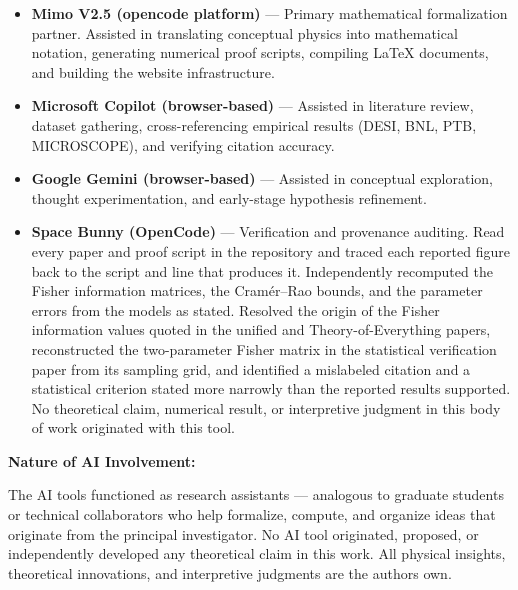\documentclass[
  10pt,
]{article}
\providecommand{\tightlist}{%
  \setlength{\itemsep}{0pt}\setlength{\parskip}{0pt}}
\begin{document}
\begin{itemize}
\tightlist
\item
  \textbf{Mimo V2.5 (opencode platform)} --- Primary mathematical
  formalization partner. Assisted in translating conceptual physics into
  mathematical notation, generating numerical proof scripts, compiling
  LaTeX documents, and building the website infrastructure.
\item
  \textbf{Microsoft Copilot (browser-based)} --- Assisted in literature
  review, dataset gathering, cross-referencing empirical results (DESI,
  BNL, PTB, MICROSCOPE), and verifying citation accuracy.
\item
  \textbf{Google Gemini (browser-based)} --- Assisted in conceptual
  exploration, thought experimentation, and early-stage hypothesis
  refinement.
\item
  \textbf{Space Bunny (OpenCode)} --- Verification and provenance
  auditing. Read every paper and proof script in the repository and
  traced each reported figure back to the script and line that produces
  it. Independently recomputed the Fisher information matrices, the
  Cramér--Rao bounds, and the parameter errors from the models as
  stated. Resolved the origin of the Fisher information values quoted in
  the unified and Theory-of-Everything papers, reconstructed the
  two-parameter Fisher matrix in the statistical verification paper from
  its sampling grid, and identified a mislabeled citation and a
  statistical criterion stated more narrowly than the reported results
  supported. No theoretical claim, numerical result, or interpretive
  judgment in this body of work originated with this tool.
\end{itemize}

\textbf{Nature of AI Involvement:}

The AI tools functioned as research assistants --- analogous to graduate
students or technical collaborators who help formalize, compute, and
organize ideas that originate from the principal investigator. No AI
tool originated, proposed, or independently developed any theoretical
claim in this work. All physical insights, theoretical innovations, and
interpretive judgments are the author\textquotesingle s own.
\end{document}

